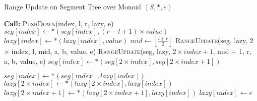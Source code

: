 \begin{algorithm}
    \caption{Range Update on Segment Tree over Monoid \((S, \ast, e)\)}
    \begin{algorithmic}[1]
            \State \textbf{Call:} \textsc{PushDown}(index, l, r, lazy, e)
                \State \Return {}
                \State $seg[index] \gets \ast(seg[index], (r - l + 1) \times value)$
                \State $lazy[index] \gets \ast(lazy[index], value)$
            \Else
                \State $mid \gets \left\lfloor \frac{l + r}{2} \right\rfloor$
                \State \textsc{RangeUpdate}(seg, lazy, 2 $\times$ index, l, mid, a, b, value, e)
                \State \textsc{RangeUpdate}(seg, lazy, $2 \times index + 1$, mid + 1, r, a, b, value, e)
                \State $seg[index] \gets \ast(seg[2 \times index], seg[2 \times index + 1])$
            \EndIf
        \EndProcedure

                \State $seg[index] \gets \ast(seg[index], lazy[index])$
                    \State $lazy[2 \times index] \gets \ast(lazy[2 \times index], lazy[index])$
                    \State $lazy[2 \times index + 1] \gets \ast(lazy[2 \times index + 1], lazy[index])$
                \EndIf
                \State $lazy[index] \gets e$ 
            \EndIf
        \EndProcedure
    \end{algorithmic}
\end{algorithm}
